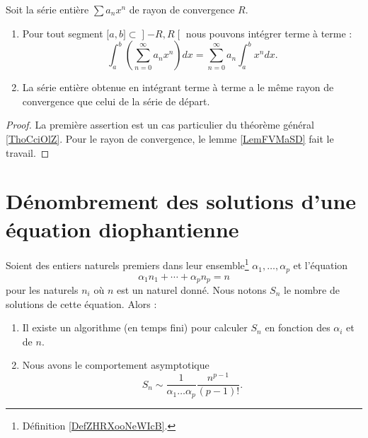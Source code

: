 \begin{proposition} \label{PropfeFQWr}
    Soit la série entière $\sum a_nx^n$ de rayon de convergence \( R\). 
    \begin{enumerate}
        \item
            Pour tout segment \( \mathopen[ a , b \mathclose]\subset\mathopen] -R , R \mathclose[\) nous pouvons intégrer terme à terme :
            \begin{equation}
                \int_a^b\left( \sum_{n=0}^{\infty}a_nx^n\right)dx=\sum_{n=0}^{\infty}a_n\int_a^bx^ndx.
            \end{equation}
        \item
            La série entière obtenue en intégrant terme à terme a le même rayon de convergence que celui de la série de départ.
    \end{enumerate}
\end{proposition}

\begin{proof}
    La première assertion est un cas particulier du théorème général \ref{ThoCciOlZ}. Pour le rayon de convergence, le lemme \ref{LemFVMaSD} fait le travail.
\end{proof}



\section{Dénombrement des solutions d'une équation diophantienne}

\begin{theorem} \label{ThoDIDNooUrFFei}
    Soient des entiers naturels premiers dans leur ensemble\footnote{Définition \ref{DefZHRXooNeWIcB}.} \( \alpha_1,\ldots, \alpha_p\) et l'équation
    \begin{equation}
        \alpha_1n_1+\cdots +\alpha_pn_p=n
    \end{equation}
    pour les naturels \( n_i\) où \( n\) est un naturel donné. Nous notons \( S_n\) le nombre de solutions de cette équation. Alors :
    \begin{enumerate}
        \item
            Il existe un algorithme (en temps fini) pour calculer \( S_n\) en fonction des \( \alpha_i\) et de \( n\).
        \item
            Nous avons le comportement asymptotique
            \begin{equation}
                S_n\sim\frac{1}{ \alpha_1\ldots\alpha_p }\frac{ n^{p-1} }{ (p-1)! }.
            \end{equation}
    \end{enumerate}
\end{theorem}

